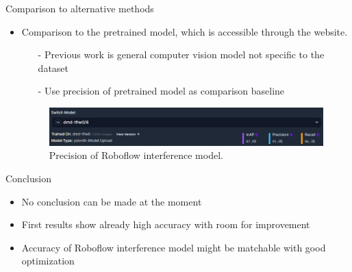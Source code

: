 \begin{frame}{\huge{Comparison to alternative methods}}
  \begin{itemize}
    \item Comparison to the pretrained model, which is accessible through the website.
    \begin{itemize}
      \item[-] Previous work is general computer vision model not specific to the dataset
      \item[-] Use precision of pretrained model as comparison baseline 
    \end{itemize}
    \vspace{5mm}
    \begin{figure}[H]
      \centering
      \includegraphics[width=.9\textwidth]{content/prec_pret.png}
      \caption{Precision of Roboflow interference model.}
    \end{figure}
  \end{itemize}
\end{frame}

\begin{frame}{\huge{Conclusion}}
  \begin{itemize}
    \item No conclusion can be made at the moment
    \item First results show already high accuracy with room for improvement
    \item Accuracy of Roboflow interference model might be matchable with good optimization
  \end{itemize}
\end{frame}

